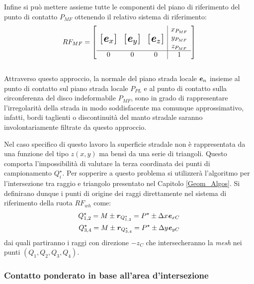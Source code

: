 Infine si può mettere assieme tutte le componenti del piano di riferimento del punto di contatto $P_{MF}$ ottenendo il relativo sistema di riferimento:
%
\begin{equation}
RF_{MF} = \left[
\begin{array}{ccc|c}
& & & x_{P_{MF}}\\
\multirow{3}{*}{\raisebox{20mm}{\scalebox{1.5}{$\left[\textbf{\textit{e}}_x\right]$}}} & \multirow{3}{*}{\raisebox{20mm}{\scalebox{1.5}{$\left[\textbf{\textit{e}}_y\right]$}}} & \multirow{3}{*}{\raisebox{20mm}{\scalebox{1.5}{$\left[\textbf{\textit{e}}_z\right]$}}} & y_{P_{MF}}\\
& & & z_{P_{MF}}\\ \hline
0 & 0 & 0 & 1
\end{array}\right]
\end{equation}\\
Attraverso questo approccio, la normale del piano strada locale $\textbf{\textit{e}}_{n}$ insieme al punto di contatto sul piano strada locale $P_{PL}$ e al punto di contatto sulla circonferenza del disco indeformabile $P_{MF}$, sono in grado di rappresentare l'irregolarità della strada in modo soddisfacente ma comunque approssimativo, infatti, bordi taglienti o discontinuità del manto stradale saranno involontariamente filtrate da questo approccio.

Nel caso specifico di questo lavoro la superficie stradale non è rappresentata da una funzione del tipo $z(x,y)$ ma bensì da una serie di triangoli. Questo comporta l'impossibilità di valutare la terza coordinata dei punti di campionamento $Q_i^\star$. Per sopperire a questo problema si utilizzerà l'algoritmo per l'intersezione tra raggio e triangolo presentato nel Capitolo \ref{Geom_Algos}. Si definirano dunque i punti di origine dei raggi direttamente nel sistema di riferimento della ruota $RF_{wh}$ come:
\begin{equation}
\begin{split}
Q^\star_{1,2} = M \pm \textbf{\textit{r}}_{Q^\star_{1,2}} = P^\star \pm \Delta x \textbf{\textit{e}}_{xC} \\
Q^\star_{3,4} = M \pm \textbf{\textit{r}}_{Q^\star_{3,4}} = P^\star \pm \Delta y \textbf{\textit{e}}_{yC}
\end{split}
\end{equation}
dai quali partiranno i raggi con direzione $-z_C$ che intersecheranno la \textit{mesh} nei punti $(Q_1, Q_2, Q_3, Q_4)$.
%
\subsubsection{Contatto ponderato in base all'area d'intersezione}
%
